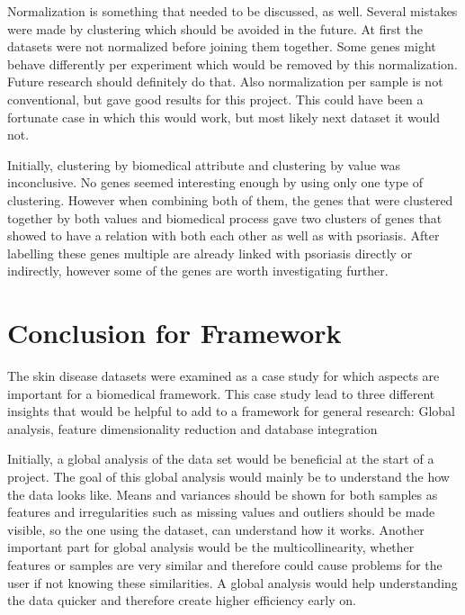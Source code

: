 \documentclass[10pt,a4paper]{report}
\begin{document}
	Normalization is something that needed to be discussed, as well. Several mistakes were made by clustering which should be avoided in the future. At first the datasets were not normalized before joining them together. Some genes might behave differently per experiment which would be removed by this normalization. Future research should definitely do that. Also normalization per sample is not conventional, but gave good results for this project. This could have been a fortunate case in which this would work, but most likely next dataset it would not.
	
	Initially, clustering by biomedical attribute and clustering by value was inconclusive. No genes seemed interesting enough by using only one type of clustering. However when combining both of them, the genes that were clustered together by both values and biomedical process gave two clusters of genes that showed to have a relation with both each other as well as with psoriasis. After labelling these genes multiple are already linked with psoriasis directly or indirectly, however some of the genes are worth investigating further.
	
	\section{Conclusion for Framework}
	\label{sec:DiscussionForFramework}
	
	The skin disease datasets were examined as a case study for which aspects are important for a biomedical framework. This case study lead to three different insights that would be helpful to add to a framework for general research: Global analysis, feature dimensionality reduction and database integration
	
	Initially, a global analysis of the data set would be beneficial at the start of a project. The goal of this global analysis would mainly be to understand the how the data looks like. Means and variances should be shown for both samples as features and irregularities such as missing values and outliers should be made visible, so the one using the dataset, can understand how it works. Another important part for global analysis would be the multicollinearity, whether features or samples are very similar and therefore could cause problems for the user if not knowing these similarities. A global analysis would help understanding the data quicker and therefore create higher efficiency early on.
	
\end{document}
